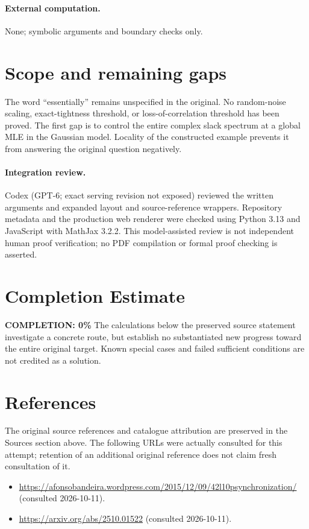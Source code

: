 \documentclass[11pt]{article}
\begin{document}
\paragraph{External computation.} None; symbolic arguments and boundary checks only.
\section{Scope and remaining gaps}
The word ``essentially'' remains unspecified in the original. No random-noise
scaling, exact-tightness threshold, or loss-of-correlation threshold has been
proved. The first gap is to control the entire complex slack spectrum at a global
MLE in the Gaussian model. Locality of the constructed example prevents it from
answering the original question negatively.
\paragraph{Integration review.} Codex (GPT-6; exact serving revision not exposed) reviewed the written arguments and expanded layout and source-reference wrappers. Repository metadata and the production web renderer were checked using Python 3.13 and JavaScript with MathJax 3.2.2. This model-assisted review is not independent human proof verification; no PDF compilation or formal proof checking is asserted.

\section{Completion Estimate}
\noindent\textbf{COMPLETION: 0\%}
The calculations below the preserved source statement investigate a concrete route,
but establish no substantiated new progress toward the entire original target.
Known special cases and failed sufficient conditions are not credited as a solution.
\section{References}
The original source references and catalogue attribution are preserved in the
Sources section above. The following URLs were actually consulted for this attempt;
retention of an additional original reference does not claim fresh consultation of it.
\begin{itemize}
\item \url{https://afonsobandeira.wordpress.com/2015/12/09/42l10psynchronization/} (consulted 2026-10-11). 
\item \url{https://arxiv.org/abs/2510.01522} (consulted 2026-10-11). 
\end{itemize}
\end{document}
